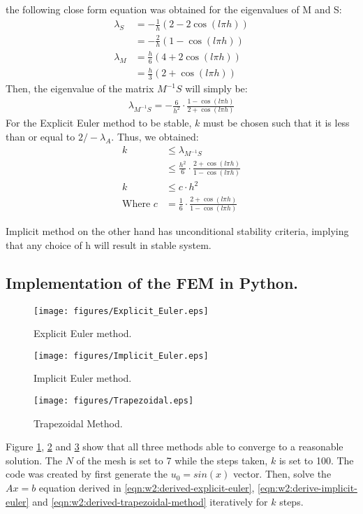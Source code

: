 \documentclass{article}
\begin{document}
the following close form equation was obtained for the eigenvalues of M and S:
\begin{align}
  \lambda_S &= -\frac{1}{h} (2 - 2\cos (l \pi h) )\\
  &= -\frac{2}{h} (1 - \cos (l \pi h) )\\
\lambda_M &= \frac{h}{6} (4 + 2 \cos (l \pi h)) \\
          &= \frac{h}{3} (2 + \cos (l \pi h))
\end{align}
Then, the eigenvalue of the matrix $M^{-1} S$ will simply be:
\begin{align}
  \lambda_{M^{-1}S} = -\frac{6}{h^2} \cdot \frac{1 - \cos (l \pi h)}{2 + \cos (l \pi h)} 
\end{align}
For the Explicit Euler method to be stable, $k$ must be chosen such that it is less than or 
equal to $2/-\lambda_A$. Thus, we obtained:
\begin{align}
k &\le \lambda_{M^{-1}S} \\
  &\le \frac{h^2}{6} \cdot \frac{2 + \cos (l \pi h)}{1 - \cos (l \pi h)} \\
k &\le c \cdot h^2 \\
\text{Where } c &= \frac{1}{6} \cdot \frac{2 + \cos (l \pi h)}{1 - \cos (l \pi h)}
\end{align}


Implicit method on the other hand has unconditional stability criteria, implying that any choice of h will result in stable system.





\subsection{Implementation of the FEM in Python.}%
\label{sub:Implementation of the FEM in Python.}
\begin{figure}[H]
  \centering
  \texttt{[image: figures/Explicit\_Euler.eps]}
  \caption{Explicit Euler method.}
  \label{fig:figures-Explicit_Euler-eps}
\end{figure}

\begin{figure}[H]
  \centering
  \texttt{[image: figures/Implicit\_Euler.eps]}
  \caption{Implicit Euler method.}
  \label{fig:figures-Implicit_Euler-eps}
\end{figure}

\begin{figure}[H]
  \centering
  \texttt{[image: figures/Trapezoidal.eps]}
  \caption{Trapezoidal Method.}
  \label{fig:figures-Trapezoidal-eps}
\end{figure}
Figure \ref{fig:figures-Explicit_Euler-eps}, \ref{fig:figures-Implicit_Euler-eps} and
\ref{fig:figures-Trapezoidal-eps} show that all three methods able to converge to a reasonable
solution. The $N$ of the mesh is set to 7 while the steps taken, $k$ is set to 100. The code was
created by first generate the $u_0 = sin(x)$ vector. Then, solve the $Ax = b$ equation derived 
in \ref{eqn:w2:derived-explicit-euler}, \ref{eqn:w2:derive-implicit-euler} and 
\ref{eqn:w2:derived-trapezoidal-method} iteratively for $k$ steps.
\end{document}

